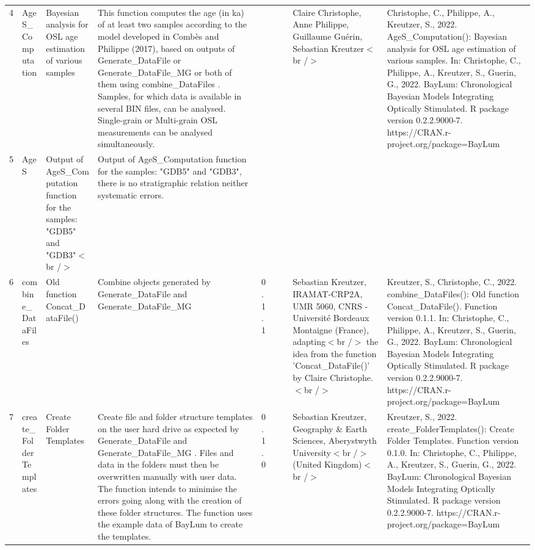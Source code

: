 \begin{table}[ht]
\begin{tabular}{rllllllll}
 \\ 
  4 & AgeS\_Computation & Bayesian analysis for OSL age estimation of various samples & This function computes the age (in ka) of at least two samples according to the model developed in Combès and Philippe (2017), based on outputs of  Generate\_DataFile  or  Generate\_DataFile\_MG  or both of them using  combine\_DataFiles .  Samples, for which data is available in several BIN files, can be analysed.  Single-grain or Multi-grain OSL measurements can be analysed simultaneously. &  &  &  & Claire Christophe, Anne Philippe, Guillaume Guérin, Sebastian Kreutzer$<$br /$>$ & Christophe, C., Philippe, A., Kreutzer, S., 2022. AgeS\_Computation(): Bayesian analysis for OSL age estimation of various samples. In: Christophe, C., Philippe, A., Kreutzer, S., Guerin, G., 2022. BayLum: Chronological Bayesian Models Integrating Optically Stimulated. R package version 0.2.2.9000-7. https://CRAN.r-project.org/package=BayLum
 \\ 
  5 & AgeS & Output of  AgeS\_Computation  function for the samples: "GDB5" and "GDB3"$<$br /$>$ & Output of  AgeS\_Computation  function for the samples: "GDB5" and "GDB3", there is no stratigraphic relation neither systematic errors. &  &  &  &  &  \\ 
  6 & combine\_DataFiles & Old function Concat\_DataFile() & Combine objects generated by  Generate\_DataFile  and  Generate\_DataFile\_MG & 0.1.1
 &  &  & Sebastian Kreutzer, IRAMAT-CRP2A, UMR 5060, CNRS - Université Bordeaux Montaigne (France), adapting$<$br /$>$ the idea from the function 'Concat\_DataFile()' by Claire Christophe.$<$br /$>$ & Kreutzer, S., Christophe, C., 2022. combine\_DataFiles(): Old function Concat\_DataFile(). Function version 0.1.1. In: Christophe, C., Philippe, A., Kreutzer, S., Guerin, G., 2022. BayLum: Chronological Bayesian Models Integrating Optically Stimulated. R package version 0.2.2.9000-7. https://CRAN.r-project.org/package=BayLum
 \\ 
  7 & create\_FolderTemplates & Create Folder Templates & Create file and folder structure templates on the user hard drive as expected by  Generate\_DataFile  and  Generate\_DataFile\_MG . Files and data in the folders must then be overwritten manually with user data. The function intends to minimise the errors going along with the creation of these folder structures. The function uses the example data of  BayLum  to create the templates. & 0.1.0
 &  &  & Sebastian Kreutzer, Geography \& Earth Sciences, Aberystwyth University$<$br /$>$ (United Kingdom)$<$br /$>$ & Kreutzer, S., 2022. create\_FolderTemplates(): Create Folder Templates. Function version 0.1.0. In: Christophe, C., Philippe, A., Kreutzer, S., Guerin, G., 2022. BayLum: Chronological Bayesian Models Integrating Optically Stimulated. R package version 0.2.2.9000-7. https://CRAN.r-project.org/package=BayLum

\end{tabular}
\end{table}
